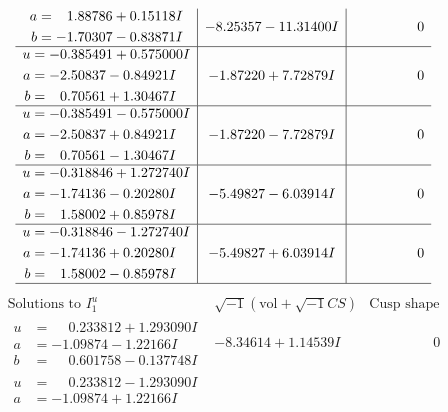 \documentclass[1p]{elsarticle_modified}
\theoremstyle{definition}
\newcommand{\I}{\sqrt{-1}}
\begin{document}
$$\begin{array}{c|c|c}
\begin{aligned}
a &= \phantom{-}1.88786 + 0.15118 I \\
b &= -1.70307 - 0.83871 I\end{aligned}
 & -8.25357 - 11.31400 I & \phantom{-0.000000 } 0 \\ \hline\begin{aligned}
u &= -0.385491 + 0.575000 I \\
a &= -2.50837 - 0.84921 I \\
b &= \phantom{-}0.70561 + 1.30467 I\end{aligned}
 & -1.87220 + 7.72879 I & \phantom{-0.000000 } 0 \\ \hline\begin{aligned}
u &= -0.385491 - 0.575000 I \\
a &= -2.50837 + 0.84921 I \\
b &= \phantom{-}0.70561 - 1.30467 I\end{aligned}
 & -1.87220 - 7.72879 I & \phantom{-0.000000 } 0 \\ \hline\begin{aligned}
u &= -0.318846 + 1.272740 I \\
a &= -1.74136 - 0.20280 I \\
b &= \phantom{-}1.58002 + 0.85978 I\end{aligned}
 & -5.49827 - 6.03914 I & \phantom{-0.000000 } 0 \\ \hline\begin{aligned}
u &= -0.318846 - 1.272740 I \\
a &= -1.74136 + 0.20280 I \\
b &= \phantom{-}1.58002 - 0.85978 I\end{aligned}
 & -5.49827 + 6.03914 I & \phantom{-0.000000 } 0\\
 \hline 
 \end{array}$$\newpage$$\begin{array}{c|c|c}  
\text{Solutions to }I^u_{1}& \I (\text{vol} + \sqrt{-1}CS) & \text{Cusp shape}\\
 \hline 
\begin{aligned}
u &= \phantom{-}0.233812 + 1.293090 I \\
a &= -1.09874 - 1.22166 I \\
b &= \phantom{-}0.601758 - 0.137748 I\end{aligned}
 & -8.34614 + 1.14539 I & \phantom{-0.000000 } 0 \\ \hline\begin{aligned}
u &= \phantom{-}0.233812 - 1.293090 I \\
a &= -1.09874 + 1.22166 I \\

\end{aligned}
\end{array}$$
\end{document}
